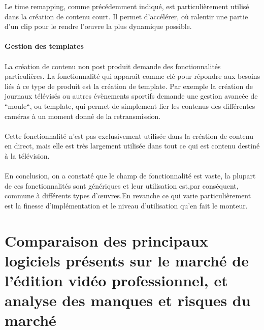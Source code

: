 Le time remapping, comme précédemment indiqué, est particulièrement
utilisé dans la création de contenu court. Il permet d'accélérer,
où ralentir une partie d'un clip pour le rendre l'œuvre la plus
dynamique possible.

\paragraph{Gestion des templates}

\paragraph{ }

La création de contenu non post produit demande des fonctionnalités
particulières. La fonctionnalité qui apparaît comme clé pour répondre
aux besoins liés à ce type de produit est la création de template. Par
exemple la création de journaux télévisés ou autres évènements
sportifs %
demande une gestion avancée de ``moule``, ou template, qui permet de
simplement lier les contenus des différentes caméras à un moment
donné de la retransmission.

\paragraph{ }

Cette fonctionnalité n'est pas exclusivement utilisée dans la création
de contenu en direct, mais elle est très largement utilisée dans tout
ce qui est contenu destiné à la télévision.

\paragraph{} \paragraph{}

En conclusion, on a constaté que le champ de fonctionnalité est vaste,
la plupart de ces fonctionnalités sont génériques et leur utilisation
est,par conséquent, commune à différents types d'œuvres.En revanche
ce qui varie particulièrement  est la finesse d'implémentation et le
niveau d'utilisation qu'en fait le monteur.

\newpage \section{Comparaison des principaux logiciels présents sur le
marché de
  l'édition vidéo professionnel, et analyse des manques et risques
  du marché}

